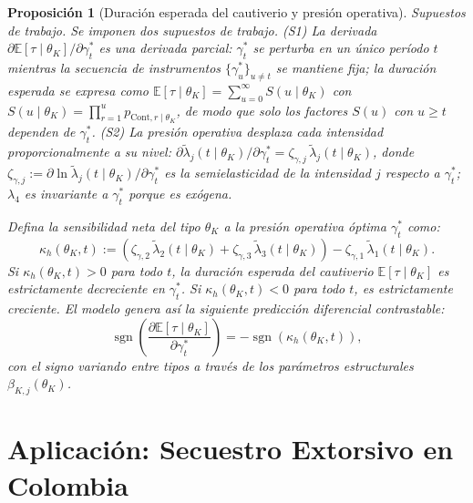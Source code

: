 \documentclass[pdflatex,sn-mathphys-ay]{sn-jnl}
\theoremstyle{thmstyleone}
\newtheorem{proposition}[theorem]{Proposición}
\theoremstyle{thmstyletwo}
\theoremstyle{thmstylethree}
\newcommand{\1}{\mathbf{1}}
\begin{document}
\begin{proposition}[Duración esperada del cautiverio y presión operativa]
\label{prop:expected-captivity-gamma}
\noindent\textit{Supuestos de trabajo.} Se imponen dos supuestos de trabajo. \textup{(S1)} La derivada $\partial\mathbb{E}[\tau\mid\theta_K]/\partial\gamma_t^\ast$ es una derivada parcial: $\gamma_t^\ast$ se perturba en un único período $t$ mientras la secuencia de instrumentos $\{\gamma_u^\ast\}_{u\neq t}$ se mantiene fija; la duración esperada se expresa como $\mathbb{E}[\tau\mid\theta_K]=\sum_{u=0}^{\infty}S(u\mid\theta_K)$ con $S(u\mid\theta_K)=\prod_{r=1}^{u}p_{\mathrm{Cont},r\mid\theta_K}$, de modo que solo los factores $S(u)$ con $u\geq t$ dependen de $\gamma_t^\ast$. \textup{(S2)} La presión operativa desplaza cada intensidad proporcionalmente a su nivel: $\partial\tilde{\lambda}_j(t\mid\theta_K)/\partial\gamma_t^\ast=\zeta_{\gamma,j}\,\tilde{\lambda}_j(t\mid\theta_K)$, donde $\zeta_{\gamma,j}:=\partial\ln\tilde{\lambda}_j(t\mid\theta_K)/\partial\gamma_t^\ast$ es la semielasticidad de la intensidad $j$ respecto a $\gamma_t^\ast$; $\lambda_4$ es invariante a $\gamma_t^\ast$ porque es exógena.

\medskip
Defina la sensibilidad neta del tipo $\theta_K$ a la presión operativa óptima $\gamma_t^\ast$ como:
\begin{equation}
\label{eq:kappa-c}
\kappa_h(\theta_K, t) := \left( \zeta_{\gamma,2}\, \tilde{\lambda}_2(t \mid \theta_K) + \zeta_{\gamma,3}\, \tilde{\lambda}_3(t \mid \theta_K) \right) - \zeta_{\gamma,1}\, \tilde{\lambda}_1(t \mid \theta_K).
\end{equation}
Si $\kappa_h(\theta_K, t) > 0$ para todo $t$, la duración esperada del cautiverio $\mathbb{E}[\tau \mid \theta_K]$ es estrictamente decreciente en $\gamma_t^\ast$. Si $\kappa_h(\theta_K, t) < 0$ para todo $t$, es estrictamente creciente. El modelo genera así la siguiente predicción diferencial contrastable:
\begin{equation}
\operatorname{sgn} \left( \frac{\partial \mathbb{E}[\tau \mid \theta_K]}{\partial \gamma_t^\ast} \right) = - \operatorname{sgn}(\kappa_h(\theta_K, t)),
\end{equation}
con el signo variando entre tipos a través de los parámetros estructurales $\beta_{K,j}(\theta_K)$.
\end{proposition}
\section{Aplicación: Secuestro Extorsivo en Colombia}\label{sec:application}
\end{document}
